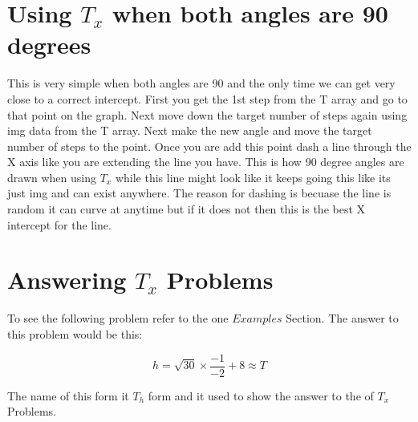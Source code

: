 \documentclass{article}
\begin{document}
 \section{Using \(T_x\) when both angles are 90 degrees}
 This is very simple when both angles are 90 and the only time we can get very close to a correct intercept. First you get the 1st step from the T array and go to that point on the graph. Next move down the target number of steps again using img data from the T array. Next make the new angle and move the target number of steps to the point. Once you are add this point dash a line through the X axis like you are extending the line you have. This is how 90 degree angles are drawn when using \(T_x\) while this line might look like it keeps going this like its just img and can exist anywhere. The reason for dashing is becuase the line is random it can curve at anytime but if it does not then this is the best X intercept for the line.


\section{Answering \(T_x\) Problems}
To see the following problem refer to the one \(Examples\) Section. The answer to this problem would be this:

\[
 h = \sqrt{30} \times \frac{-1}{-2} + 8 \approx T 
\]

The name of this form it \(T_h\) form and it used to show the answer to the of \(T_x\) Problems.
\end{document}
